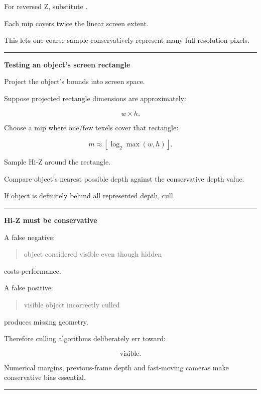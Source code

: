 For reversed Z, substitute .

Each mip covers twice the linear screen extent.

This lets one coarse sample conservatively represent many full-resolution pixels.

\begin{center}\rule{0.5\linewidth}{0.5pt}\end{center}

\textbf{Testing an object's screen rectangle}

Project the object's bounds into screen space.

Suppose projected rectangle dimensions are approximately:

\[
w\times h.
\]

Choose a mip where one/few texels cover that rectangle:

\[
\boxed{
m
\approx
\left\lfloor
\log_2
\max(w,h)
\right\rfloor.
}
\]

Sample Hi-Z around the rectangle.

Compare object's nearest possible depth against the conservative depth value.

If object is definitely behind all represented depth, cull.

\begin{center}\rule{0.5\linewidth}{0.5pt}\end{center}

\textbf{Hi-Z must be conservative}

A false negative:

\begin{quote}
object considered visible even though hidden
\end{quote}

costs performance.

A false positive:

\begin{quote}
visible object incorrectly culled
\end{quote}

produces missing geometry.

Therefore culling algorithms deliberately err toward:

\[
\boxed{
\text{visible}.
}
\]

Numerical margins, previous-frame depth and fast-moving cameras make conservative bias essential.

\begin{center}\rule{0.5\linewidth}{0.5pt}\end{center}

